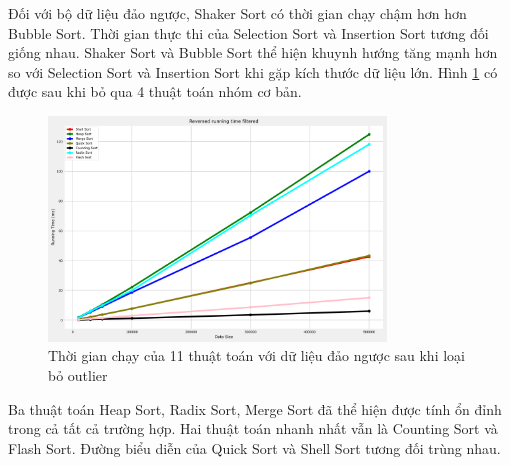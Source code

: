 Đối với bộ dữ liệu đảo ngược, Shaker Sort có thời gian chạy chậm hơn hơn Bubble Sort. Thời gian thực thi của Selection Sort và Insertion Sort tương đối giống nhau. Shaker Sort và Bubble Sort thể hiện khuynh hướng tăng mạnh hơn so với Selection Sort và Insertion Sort khi gặp kích thước dữ liệu lớn. Hình \ref{fig:reversed_running_time_filtered} có được sau khi bỏ qua 4 thuật toán nhóm cơ bản.

\begin{figure}[H]
    \centering
    \includegraphics[width=0.8\textwidth]{exprimental_result/images/reversed_running_time_filtered.png}
    \caption{Thời gian chạy của 11 thuật toán với dữ liệu đảo ngược sau khi loại bỏ outlier}
    \label{fig:reversed_running_time_filtered}
\end{figure}


Ba thuật toán Heap Sort, Radix Sort, Merge Sort đã thể hiện được tính ổn đỉnh trong cả tất cả trường hợp. Hai thuật toán nhanh nhất vẫn là Counting Sort và Flash Sort. Đường biểu diễn của Quick Sort và Shell Sort tương đối trùng nhau.







